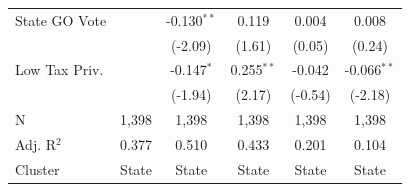 \begin{tabular*}{\textwidth}{@{\extracolsep{\fill}}lccccc}
   State GO Vote        &                & -0.130$^{**}$  & 0.119        & 0.004          & 0.008\\   
                        &                & (-2.09)       & (1.61)      & (0.05)        & (0.24)\\   
   Low Tax Priv.        &                & -0.147$^{*}$   & 0.255$^{**}$ & -0.042         & -0.066$^{**}$\\   
                        &                & (-1.94)       & (2.17)      & (-0.54)       & (-2.18)\\   
   \hline
   N         & 1,398          & 1,398          & 1,398        & 1,398          & 1,398\\  
   Adj. R$^2$       & 0.377          & 0.510          & 0.433        & 0.201          & 0.104\\  
   Cluster              & State & State & State & State & State\\  
   \bottomrule
\end{tabular*}
\par\endgroup
